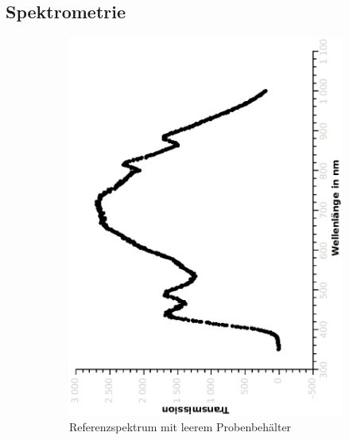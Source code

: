 \documentclass{article}
\begin{document}
\subsection{Spektrometrie}

\begin{figure}[H]
\caption{Spektra an der Halogenlampe}
\centering
\begin{subfigure}[h]{0.4\textwidth}
\includegraphics[width=\textwidth ,angle=-90]{eps/referenztrans1.eps}
\caption{Referenzspektrum mit leerem Probenbehälter}
\end{subfigure}
\begin{subfigure}[h]{0.4\textwidth}

\end{subfigure}
\end{figure}
\end{document}

